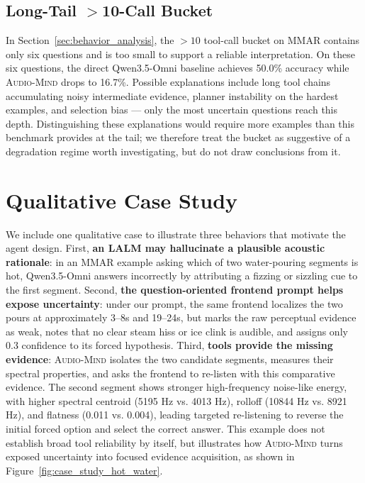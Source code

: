 \documentclass[11pt]{article}
\newcommand{\ours}{\textsc{Audio-Mind}}
\begin{document}
\subsection{Long-Tail \texorpdfstring{$>$}{>}10-Call Bucket}

In Section~\ref{sec:behavior_analysis}, the $>10$ tool-call bucket on MMAR contains only six questions and is too small to support a reliable interpretation. On these six questions, the direct Qwen3.5-Omni baseline achieves 50.0\% accuracy while \ours{} drops to 16.7\%. Possible explanations include long tool chains accumulating noisy intermediate evidence, planner instability on the hardest examples, and selection bias --- only the most uncertain questions reach this depth. Distinguishing these explanations would require more examples than this benchmark provides at the tail; we therefore treat the bucket as suggestive of a degradation regime worth investigating, but do not draw conclusions from it.



\section{Qualitative Case Study}
\label{sec:case_study}

We include one qualitative case to illustrate three behaviors that motivate the agent design. First, \textbf{an LALM may hallucinate a plausible acoustic rationale}: in an MMAR example asking which of two water-pouring segments is hot, Qwen3.5-Omni answers incorrectly by attributing a fizzing or sizzling cue to the first segment. Second, \textbf{the question-oriented frontend prompt helps expose uncertainty}: under our prompt, the same frontend localizes the two pours at approximately 3--8s and 19--24s, but marks the raw perceptual evidence as weak, notes that no clear steam hiss or ice clink is audible, and assigns only 0.3 confidence to its forced hypothesis. Third, \textbf{tools provide the missing evidence}: \ours{} isolates the two candidate segments, measures their spectral properties, and asks the frontend to re-listen with this comparative evidence. The second segment shows stronger high-frequency noise-like energy, with higher spectral centroid (5195 Hz vs. 4013 Hz), rolloff (10844 Hz vs. 8921 Hz), and flatness (0.011 vs. 0.004), leading targeted re-listening to reverse the initial forced option and select the correct answer. This example does not establish broad tool reliability by itself, but illustrates how \ours{} turns exposed uncertainty into focused evidence acquisition, as shown in Figure~\ref{fig:case_study_hot_water}.
\end{document}
